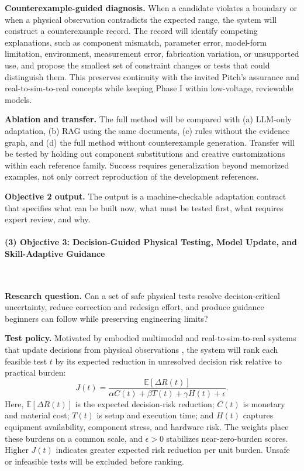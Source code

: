 \documentclass[11pt,letterpaper]{article}
\begin{document}
\textbf{Counterexample-guided diagnosis.} When a candidate violates a boundary or when a physical observation contradicts the expected range, the system will construct a counterexample record. 
The record will identify competing explanations, such as component mismatch, parameter error, model-form limitation, environment, measurement error, fabrication variation, or unsupported use, and propose the smallest set of constraint changes or tests that could distinguish them. This preserves continuity with the invited Pitch's assurance and real-to-sim-to-real concepts while keeping Phase I within low-voltage, reviewable models.

\textbf{Ablation and transfer.} The full method will be compared with (a) LLM-only adaptation, (b) RAG using the same documents, (c) rules without the evidence graph, and (d) the full method without counterexample generation. Transfer will be tested by holding out component substitutions and creative customizations within each reference family. Success requires generalization beyond memorized examples, not only correct reproduction of the development references.

\textbf{Objective 2 output.} The output is a machine-checkable adaptation contract that specifies what can be built now, what must be tested first, what requires expert review, and why.

\paragraph{(3) Objective 3: Decision-Guided Physical Testing, Model Update, and Skill-Adaptive Guidance}~{}

\textbf{Research question.}
Can a set of safe physical tests resolve decision-critical uncertainty, reduce correction and redesign effort, and produce guidance beginners can follow while preserving engineering limits?

\textbf{Test policy.}
Motivated by embodied multimodal and real-to-sim-to-real systems that update decisions from physical observations \cite{driess2023palme,brohan2023rt2,torne2024realtosim}, the system will rank each feasible test \(t\) by its expected reduction in unresolved decision risk relative to practical burden:
\[
J(t)=
\frac{\mathbb{E}[\Delta R(t)]}
{\alpha C(t)+\beta T(t)+\gamma H(t)+\epsilon}.
\]
Here, \(\mathbb{E}[\Delta R(t)]\) is the expected decision-risk reduction; \(C(t)\) is monetary and material cost; \(T(t)\) is setup and execution time; and \(H(t)\) captures equipment availability, component stress, and hardware risk. The weights place these burdens on a common scale, and \(\epsilon>0\) stabilizes near-zero-burden scores. Higher \(J(t)\) indicates greater expected risk reduction per unit burden. Unsafe or infeasible tests will be excluded before ranking.
\end{document}
